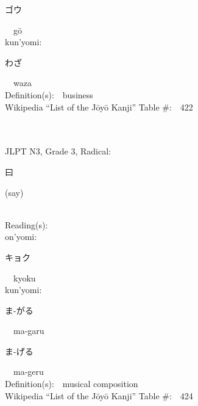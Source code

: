 \begin{multicols}{2}
{\hspace*{2em}}{\begin{CJK}{UTF8}{min} ゴウ \end{CJK}}\ \ g\=o\ \ \\
{\hspace*{1em}}kun'yomi:\ \ \\
{\hspace*{2em}}{\begin{CJK}{UTF8}{min} わざ \end{CJK}}\ \ waza\ \ \\
Definition(s):\ \ business \\
Wikipedia ``List of the J\=oy\=o Kanji'' Table \#:\ \ 422 \\
\ \ \\
{\fontsize{34pt}{40pt}  }\ \ \\  %
{JLPT N3, Grade 3, Radical:\ \ {\begin{CJK}{UTF8}{min} 曰 \end{CJK}} (say) } \\
Reading(s):\ \ \\
{\hspace*{1em}}on'yomi:\ \ \\
{\hspace*{2em}}{\begin{CJK}{UTF8}{min} キョク \end{CJK}}\ \ kyoku\ \ \\
{\hspace*{1em}}kun'yomi:\ \ \\
{\hspace*{2em}}{\begin{CJK}{UTF8}{min} ま-がる \end{CJK}}\ \ ma-garu\ \ \\
{\hspace*{2em}}{\begin{CJK}{UTF8}{min} ま-げる \end{CJK}}\ \ ma-geru\ \ \\
Definition(s):\ \ musical composition \\
Wikipedia ``List of the J\=oy\=o Kanji'' Table \#:\ \ 424 \\
\ \ \\
{\fontsize{34pt}{40pt}  }\ \ \\  %

\end{multicols}
